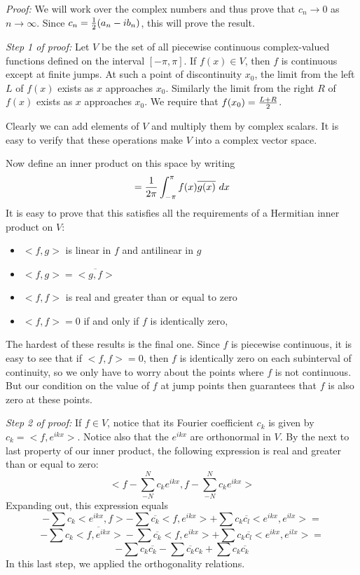 \documentclass[11pt, oneside]{article}   	%
\begin{document}
{\em Proof:} We will work over the complex numbers and thus prove that $c_n \rightarrow 0$ as $n \rightarrow \infty$. Since $c_n = {1 \over 2} (a_n - i b_n)$, this will prove the result.

{\em Step 1 of proof:} Let $V$ be the set of all piecewise continuous complex-valued functions defined on the interval
$[ - \pi, \pi]$. If $f(x) \in V$, then $f$ is continuous except at finite jumps. At such a point of discontinuity $x_0$,
the limit from the left $L$ of $f(x)$ exists as $x$ approaches $x_0$. Similarly the limit from the right $R$ of $f(x)$ exists as $x$ approaches $x_0$. We require that $f(x_0) = {{L + R} \over 2}$.

Clearly we can add elements of $V$ and multiply them by complex scalars. It is easy to verify that these operations make $V$ into a complex vector space.

Now define an inner product on this space by writing \[< f, g > = {1 \over {2 \pi}} \int_{- \pi}^\pi f(x) \overline{g(x)} \ dx\] 
It is easy to prove that this satisfies all the requirements of a Hermitian inner product on $V$:
\begin{itemize}
\item $<f, g>$ is linear in $f$ and antilinear in $g$
\item $<f, g> = \overline{<g, f>}$
\item $<f, f>$ is real and greater than or equal to zero
\item $<f, f> = 0$ if and only if $f$ is identically zero,
\end{itemize}

The hardest of these results is the final one. Since $f$ is piecewise continuous, it is easy to see that if $<f, f> = 0$,
then $f$ is identically zero on each subinterval of continuity, so we only have to worry about the points where $f$ is not continuous.  But our condition on the value of $f$ at jump points then guarantees that $f$ is also zero at these points.

{\em Step 2 of proof:} If $f \in V$, notice that its Fourier coefficient $c_k$ is given by $c_k = <f, e^{ikx}>$. Notice also that the $e^{ikx}$ are orthonormal in $V$. By the next to last property of our inner product, the following expression is real and greater than or equal to zero:
\[ <f - \sum_{-N}^N c_k e^{ikx}, f - \sum_{-N}^N c_k e^{ikx}>\]
Expanding out, this expression equals
\[<f, f> - \sum c_k<e^{ikx}, f> - \sum \overline{c_k} <f, e^{ikx}> + \sum c_k \overline{c_l} <e^{ikx}, e^{ilx}> = \]
\[<f, f> - \sum c_k \overline{<f, e^{ikx}>} - \sum \overline{c_k} <f, e^{ikx}> + \sum c_k \overline{c_l} <e^{ikx}, e^{ilx}> = \]
\[<f, f> - \sum c_k \overline{c_k} - \sum \overline{c_k} c_k + \sum c_k \overline{c_k}\]
In this last step, we applied the orthogonality relations.
\end{document}
